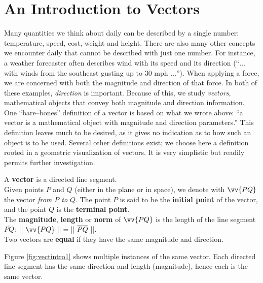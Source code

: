 \section{An Introduction to Vectors}\label{sec:vector_intro}

Many quantities we think about daily can be described by a single number: temperature, speed, cost, weight and height. There are also many other concepts we encounter daily that cannot be described with just one number. For instance, a weather forecaster often describes wind with its speed and its direction (``$\ldots$ with winds from the southeast gusting up to 30 mph $\ldots$''). When applying a force, we are concerned with both the magnitude and direction of that force. In both of these examples, \textit{direction} is important. Because of this, we study \textit{vectors}, mathematical objects that convey both magnitude and direction information.\\

One ``bare--bones'' definition of a vector is based on what we wrote above: ``a vector is a mathematical object with magnitude and direction parameters.'' This definition leaves much to be desired, as it gives no indication as to how such an object is to be used. Several other definitions exist; we choose here a definition rooted in a geometric visualization of vectors. It is very simplistic but readily permits further investigation.

{A \textbf{vector} is a directed line segment.\\

Given points $P$ and $Q$ (either in the plane or in space), we denote with $\vv{PQ}$ the vector \textit{from $P$ to $Q$}. The point $P$ is said to be the \textbf{initial point} of the vector, and the point $Q$ is the \textbf{terminal point}. \\

The \textbf{magnitude}, \textbf{length} or \textbf{norm} of $\vv{PQ}$ is the length of the line segment $\overline{PQ}$: $\norm{\vv{PQ}} = \norm{\overline{PQ}}$.\\

Two vectors are \textbf{equal} if they have the same magnitude and direction.
}

Figure \ref{fig:vectintro1} shows multiple instances of the same vector. Each directed line segment has the same direction and length (magnitude), hence each is the same vector.

